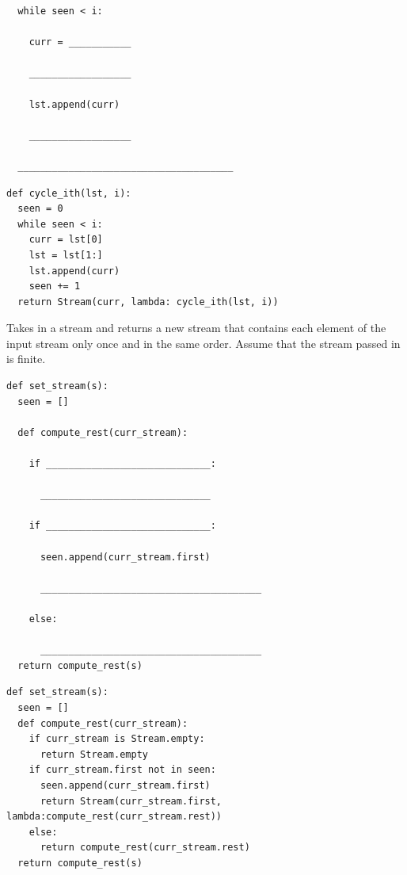 \documentclass{exam}
\begin{document}
\begin{questions}
\begin{lstlisting}
  while seen < i:

    curr = ___________

    __________________

    lst.append(curr)

    __________________

  ______________________________________
\end{lstlisting}
\begin{solution}
\begin{lstlisting}
def cycle_ith(lst, i):
  seen = 0
  while seen < i:
    curr = lst[0]
    lst = lst[1:]
    lst.append(curr)
    seen += 1
  return Stream(curr, lambda: cycle_ith(lst, i))
\end{lstlisting}
\end{solution}

\item Takes in a stream and returns a new stream that contains each element of the input stream only once and in the same order. Assume that the stream passed in is finite.
\newline
\begin{lstlisting}
def set_stream(s):
  seen = []

  def compute_rest(curr_stream):

    if _____________________________:

      ______________________________

    if _____________________________:

      seen.append(curr_stream.first)

      _______________________________________

    else:

      _______________________________________
  return compute_rest(s)
\end{lstlisting}
\begin{solution}
\begin{lstlisting}
def set_stream(s):
  seen = []
  def compute_rest(curr_stream):
    if curr_stream is Stream.empty:
      return Stream.empty
    if curr_stream.first not in seen:
      seen.append(curr_stream.first)
      return Stream(curr_stream.first, lambda:compute_rest(curr_stream.rest))
    else:
      return compute_rest(curr_stream.rest)
  return compute_rest(s)
\end{lstlisting}
\end{solution}
\end{questions}

\end{document}
